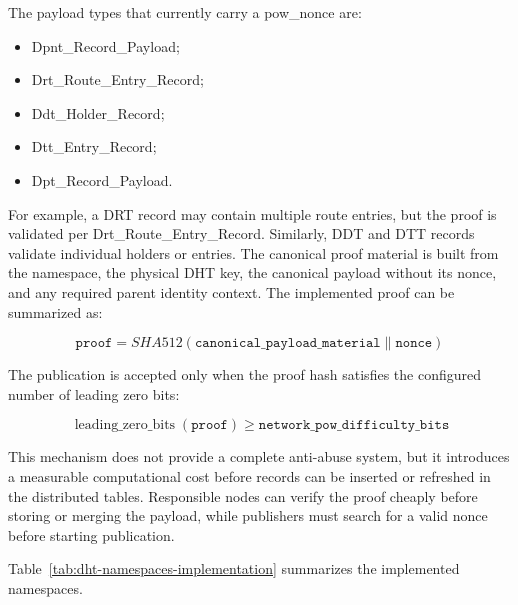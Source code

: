 \documentclass[12pt,a4paper]{article}
\newcommand{\codebreak}[1]{{\footnotesize\ttfamily #1}}
\begin{document}
The payload types that currently carry a \codebreak{pow\_\allowbreak{}nonce} are:

\begin{itemize}
    \item \codebreak{Dpnt\_\allowbreak{}Record\_\allowbreak{}Payload};
    \item \codebreak{Drt\_\allowbreak{}Route\_\allowbreak{}Entry\_\allowbreak{}Record};
    \item \codebreak{Ddt\_\allowbreak{}Holder\_\allowbreak{}Record};
    \item \codebreak{Dtt\_\allowbreak{}Entry\_\allowbreak{}Record};
    \item \codebreak{Dpt\_\allowbreak{}Record\_\allowbreak{}Payload}.
\end{itemize}

For example, a DRT record may contain multiple route entries, but the proof is validated per \codebreak{Drt\_\allowbreak{}Route\_\allowbreak{}Entry\_\allowbreak{}Record}. Similarly, DDT and DTT records validate individual holders or entries. The canonical proof material is built from the namespace, the physical DHT key, the canonical payload without its nonce, and any required parent identity context. The implemented proof can be summarized as:

\begin{equation}
    \texttt{proof} = SHA512(\texttt{canonical\_payload\_material} \parallel \texttt{nonce})
\end{equation}

The publication is accepted only when the proof hash satisfies the configured number of leading zero bits:

\begin{equation}
    \operatorname{leading\_zero\_bits}(\texttt{proof}) \geq \texttt{network\_pow\_difficulty\_bits}
\end{equation}

This mechanism does not provide a complete anti-abuse system, but it introduces a measurable computational cost before records can be inserted or refreshed in the distributed tables. Responsible nodes can verify the proof cheaply before storing or merging the payload, while publishers must search for a valid nonce before starting publication.

Table~\ref{tab:dht-namespaces-implementation} summarizes the implemented namespaces.
\end{document}
